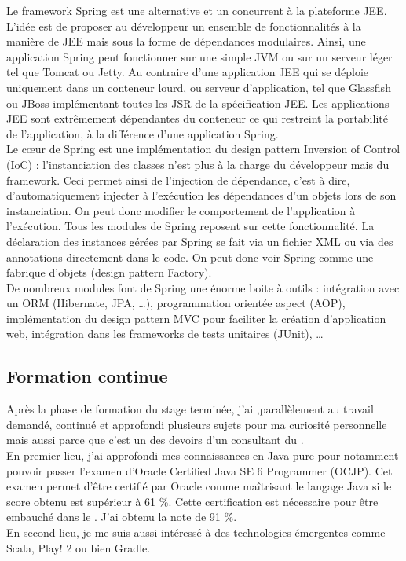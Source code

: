 Le framework Spring \cite{spring} est une alternative et un concurrent à la plateforme JEE. L'idée est de proposer au développeur un ensemble de fonctionnalités à la manière de JEE mais sous la forme de dépendances modulaires. Ainsi, une application Spring peut fonctionner sur une simple JVM ou sur un serveur léger tel que Tomcat ou Jetty. Au contraire d'une application JEE qui se déploie uniquement dans un conteneur lourd, ou serveur d'application, tel que Glassfish ou JBoss implémentant toutes les JSR de la spécification JEE. Les applications JEE sont extrêmement dépendantes du conteneur ce qui restreint la portabilité de l'application, à la différence d'une application Spring.\\

Le c\oe{}ur de Spring est une implémentation du design pattern Inversion of Control (IoC) : l'instanciation des classes n'est plus à la charge du développeur mais du framework. Ceci permet ainsi de l'injection de dépendance, c'est à dire, d'automatiquement injecter à l'exécution les dépendances d'un objets lors de son instanciation. On peut donc modifier le comportement de l'application à l'exécution. Tous les modules de Spring reposent sur cette fonctionnalité. La déclaration des instances gérées par Spring se fait via un fichier XML ou via des annotations directement dans le code. On peut donc voir Spring comme une fabrique d'objets (design pattern Factory).\\

De nombreux modules font de Spring une énorme boite à outils : intégration avec un ORM (Hibernate, JPA, \dots), programmation orientée aspect (AOP), implémentation du design pattern MVC pour faciliter la création d'application web, intégration dans les frameworks de tests unitaires (JUnit), \dots

\subsection{Formation continue}

Après la phase de formation du stage terminée, j'ai ,parallèlement au travail demandé, continué et approfondi plusieurs sujets pour ma curiosité personnelle mais aussi parce que c'est un des devoirs d'un consultant du \excilysGroup{}.\\

En premier lieu, j'ai approfondi mes connaissances en Java pure pour notamment pouvoir passer l'examen d'Oracle Certified Java SE 6 Programmer (OCJP). Cet examen permet d'être certifié par Oracle comme \flqq{}maîtrisant le langage Java\frqq{} si le score obtenu est supérieur à 61 \%. Cette certification est nécessaire pour être embauché dans le \excilysGroup{}. J'ai obtenu la note de 91 \%.\\

En second lieu, je me suis aussi intéressé à des technologies émergentes comme Scala, Play! 2 ou bien Gradle.